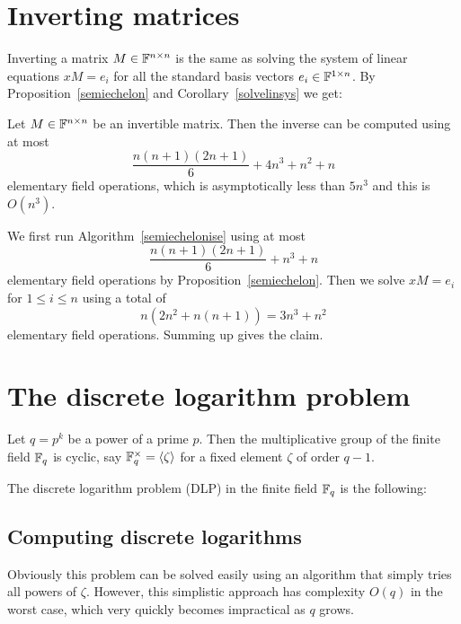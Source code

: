 \section{Inverting matrices}
\label{sec:invert}

Inverting a matrix $M \in \mathbb{F}^{n \times n}$ is the same as solving the
system of linear equations $xM = e_i$ for all the standard basis
vectors $e_i \in \mathbb{F}^{1 \times n}$. By Proposition~\ref{semiechelon}
and Corollary~\ref{solvelinsys} we get:

\begin{Prop}
Let $M \in \mathbb{F}^{n \times n}$ be an invertible matrix. Then the inverse
can be computed using at most
\[ \frac{n(n+1)(2n+1)}{6} + 4n^3 + n^2 + n \]
elementary field operations, which is asymptotically less than $5n^3$
and this is $O(n^3)$.
\end{Prop}
\proofbeg
We first run Algorithm~\ref{semiechelonise} using at most
\[ \frac{n(n+1)(2n+1)}{6} + n^3 + n \]
elementary field operations by Proposition~\ref{semiechelon}. Then
we solve $xM = e_i$ for $1 \le i \le n$ using a total of
\[ n(2n^2+n(n+1)) = 3n^3+n^2 \]
elementary field operations. Summing up gives the claim.
\proofend

\section{The discrete logarithm problem}
\label{thedlp}

\begin{Problem}
    Let $q = p^k$ be a power of a prime $p$. Then the multiplicative
    group of the finite field $\mathbb{F}_q$ is cyclic, say $\mathbb{F}_q^\times =
    \left< \zeta \right>$ for a fixed element $\zeta$ of order $q-1$.

    The discrete logarithm problem (DLP) in the finite field $\mathbb{F}_q$ is
    the following:

    \begin{center}
\end{center}
\end{Problem}

\subsection{Computing discrete logarithms}

Obviously this problem can be solved easily using an algorithm that
simply tries all powers of $\zeta$. However, this simplistic approach
has complexity $O(q)$ in the worst case, which very quickly
becomes impractical as $q$ grows.

